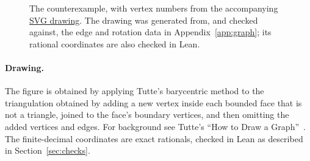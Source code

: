 \documentclass[11pt]{article}
\begin{document}
\begin{appendices}
\begin{figure}[H]
\caption{The counterexample, with vertex numbers from the accompanying
\href{https://raw.githubusercontent.com/6/clank-lab/main/results/steinberg-c4-c9/data/graph.svg}{SVG drawing}.
The drawing was generated from, and checked against, the edge and rotation
data in Appendix~\ref{app:graph}; its rational coordinates are also checked in Lean.}
\label{fig:graph}
\end{figure}

\paragraph{Drawing.} The figure is obtained by applying Tutte's barycentric
method to the triangulation obtained by adding a new vertex inside each
bounded face that is not a triangle, joined to the face's boundary
vertices, and then omitting the added vertices and edges. For background see Tutte's
``How to Draw a Graph''~\cite{tutte}. The finite-decimal coordinates are exact
rationals, checked in Lean as described in Section~\ref{sec:checks}.


\end{appendices}
\end{document}
